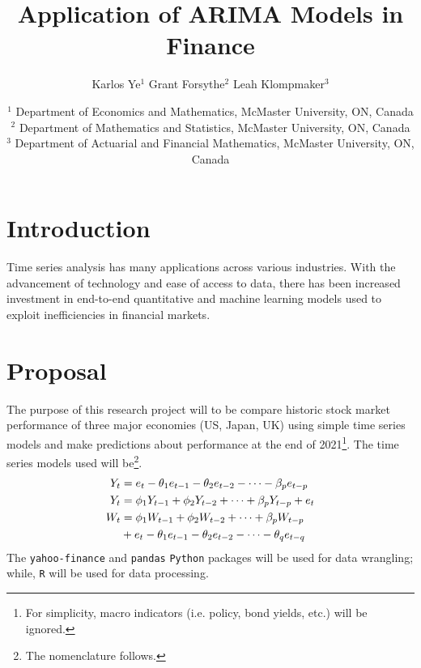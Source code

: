 \documentclass[12pt, centerh1]{article}
\title{Application of ARIMA Models in Finance}
\author{\qquad Karlos Ye$^{1}$ \qquad Grant Forsythe$^{2}$ \qquad Leah Klompmaker$^{3}$}
\date{
{\footnotesize $^1$ Department of Economics and Mathematics, McMaster University, ON, Canada\\[-6pt]
               $^2$ Department of Mathematics and Statistics, McMaster University, ON, Canada\\[-6pt]
               $^3$ Department of Actuarial and Financial Mathematics, McMaster University, ON, Canada\\[-6pt]}
}
\begin{document}
\clearpage\maketitle
\setcounter{page}{1}
\section{Introduction}
Time series analysis has many applications across various industries. With the advancement of technology and ease of access to data, there has been increased investment in end-to-end quantitative and machine learning models used to exploit inefficiencies in financial markets\citep{coqueret2021machine}.
\section{Proposal}
The purpose of this research project will to be compare historic stock market performance of three major economies (US, Japan, UK) using simple time series models and make predictions about performance at the end of 2021\footnote{For simplicity, macro indicators (i.e. policy, bond yields, etc.) will be ignored.}. The time series models used will be\footnote{The nomenclature follows\citet{cryer2008time}.}.
\begin{align} 
\centering
    Y_t &= e_t - \theta_1e_{t-1} - \theta_2e_{t-2} - \cdots - \beta_pe_{t-p}\\
    Y_t &= \phi_1Y_{t-1} + \phi_2Y_{t-2} + \cdots + \beta_pY_{t-p} + e_t\\
    W_t &= \phi_1W_{t-1} + \phi_2W_{t-2} + \cdots + \beta_pW_{t-p}\\
        &+ e_t - \theta_1e_{t-1} - \theta_2e_{t-2} - \cdots - \theta_qe_{t-q}\nonumber
\end{align}
The \texttt{yahoo-finance} and \texttt{pandas} \texttt{Python} packages will be used for data wrangling; while, \texttt{R} will be used for data processing.

\newpage

\newpage

\nocite{*}


\end{document}
